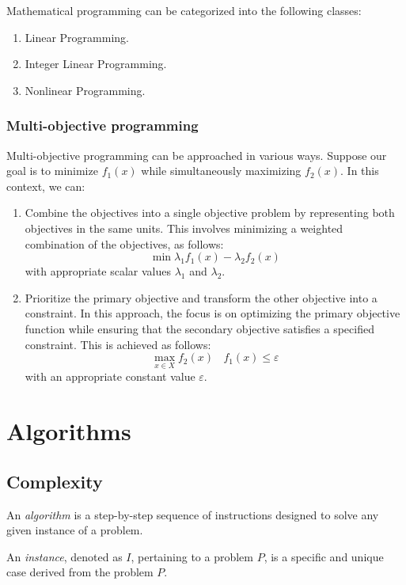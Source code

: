 \documentclass[12pt, a4paper]{report}
\begin{document}
    Mathematical programming can be categorized into the following classes:
    \begin{enumerate}
        \item Linear Programming.
        \item Integer Linear Programming.
        \item Nonlinear Programming. 
    \end{enumerate}
    
    \subsection{Multi-objective programming}
    Multi-objective programming can be approached in various ways. 
    Suppose our goal is to minimize $f_1(x)$ while simultaneously maximizing $f_2(x)$. 
    In this context, we can:
    \begin{enumerate}
        \item Combine the objectives into a single objective problem by representing both objectives in the same units. 
            This involves minimizing a weighted combination of the objectives, as follows:
            \[\min{\lambda_1f_1(x)-\lambda_2f_2(x)}\]
            with appropriate scalar values $\lambda_1$ and $\lambda_2$.
        \item Prioritize the primary objective and transform the other objective into a constraint. 
            In this approach, the focus is on optimizing the primary objective function while ensuring that the secondary objective satisfies a specified constraint. 
            This is achieved as follows:
            \[\max_{x \in X}f_2(x) \:\:\:\: f_1(x)\leq \varepsilon\]
            with an appropriate constant value $\varepsilon$. 
    \end{enumerate}

\newpage

\chapter{Algorithms}
    \section{Complexity}
    \begin{definition}
        An \emph{algorithm} is a step-by-step sequence of instructions designed to solve any given instance of a problem.

        An \emph{instance}, denoted as $I$, pertaining to a problem $P$, is a specific and unique case derived from the problem $P$.
    \end{definition}
\end{document}
